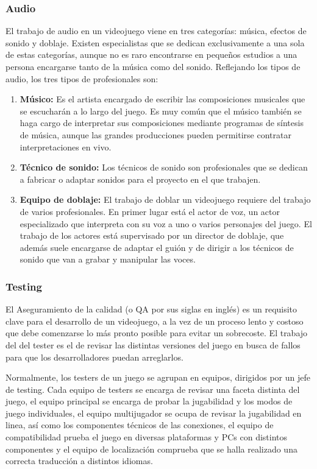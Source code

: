 \subsubsection{Audio}
El trabajo de audio en un videojuego viene en tres categorías: música, efectos de sonido y doblaje. Existen especialistas que se dedican exclusivamente a una sola de estas categorías, aunque no es raro encontrarse en pequeños estudios a una persona encargarse tanto de la música como del sonido. Reflejando los tipos de audio, los tres tipos de profesionales son:
\begin{enumerate}
\item \textbf{Músico:} Es el artista encargado de escribir las composiciones musicales que se escucharán a lo largo del juego. Es muy común que el músico también se haga cargo de interpretar sus composiciones mediante programas de síntesis de música, aunque las grandes producciones pueden permitirse contratar interpretaciones en vivo.
\item \textbf{Técnico de sonido:} Los técnicos de sonido son profesionales que se dedican a fabricar o adaptar sonidos para el proyecto en el que trabajen.
\item \textbf{Equipo de doblaje:} El trabajo de doblar un videojuego requiere del trabajo de varios profesionales. En primer lugar está el actor de voz, un actor especializado que interpreta con su voz a uno o varios personajes del juego. El trabajo de los actores está supervisado por un director de doblaje, que además suele encargarse de adaptar el guión y de dirigir a los técnicos de sonido que van a grabar y manipular las voces.
\end{enumerate}

\subsubsection{Testing}
El Aseguramiento de la calidad (o QA por sus siglas en inglés) es un requisito clave para el desarrollo de un videojuego, a la vez de un proceso lento y costoso que debe comenzarse lo más pronto posible para evitar un sobrecoste. El trabajo del del tester es el de revisar las distintas versiones del juego en busca de fallos para que los desarrolladores puedan arreglarlos.

Normalmente, los testers de un juego se agrupan en equipos, dirigidos por un jefe de testing. Cada equipo de testers se encarga de revisar una faceta distinta del juego, el equipo principal se encarga de probar la jugabilidad y los modos de juego individuales, el equipo multijugador se ocupa de revisar la jugabilidad en linea, así como los componentes técnicos de las conexiones, el equipo de compatibilidad prueba el juego en diversas plataformas y PCs con distintos componentes y el equipo de localización comprueba que se halla realizado una correcta traducción a distintos idiomas.

